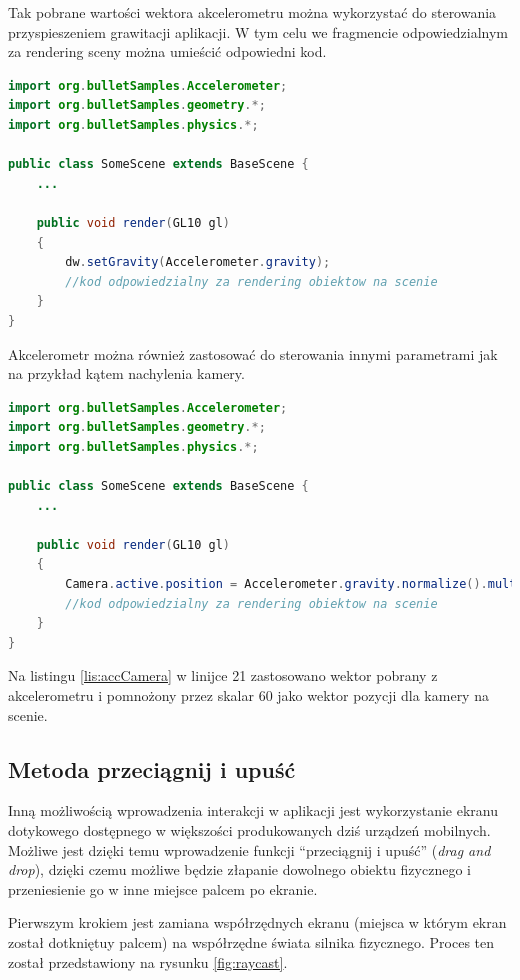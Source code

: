 Tak pobrane wartości wektora akcelerometru można wykorzystać do sterowania
przyspieszeniem grawitacji aplikacji. W tym celu we fragmencie odpowiedzialnym
za rendering sceny można umieścić odpowiedni kod.

\begin{lstlisting}[language=java, caption=Sterowanie wektorem przyspieszenia
ziemskiego przy pomocy akcelerometru]import org.bulletSamples.Accelerometer;
import org.bulletSamples.geometry.*;
import org.bulletSamples.physics.*;

public class SomeScene extends BaseScene {
	...
	
	public void render(GL10 gl)
	{
		dw.setGravity(Accelerometer.gravity);
		//kod odpowiedzialny za rendering obiektow na scenie
	}
}
\end{lstlisting}

Akcelerometr można również zastosować do sterowania innymi parametrami jak na
przykład kątem nachylenia kamery.

\newpage
\begin{lstlisting}[language=java, caption=Sterowanie kątem nachylenia kamery
przy pomocy akcelerometru, label=lis:accCamera]import org.bulletSamples.Accelerometer;
import org.bulletSamples.geometry.*;
import org.bulletSamples.physics.*;

public class SomeScene extends BaseScene {
	...
	
	public void render(GL10 gl)
	{
		Camera.active.position = Accelerometer.gravity.normalize().multiply(60);
		//kod odpowiedzialny za rendering obiektow na scenie
	}
}
\end{lstlisting}

Na listingu \ref{lis:accCamera} w linijce 21 zastosowano wektor pobrany z
akcelerometru i pomnożony przez skalar 60 jako wektor pozycji dla kamery na
scenie.

\subsection{Metoda przeciągnij i upuść}\label{sec:dragAndDrop}
Inną możliwością wprowadzenia interakcji w aplikacji jest wykorzystanie ekranu
dotykowego dostępnego w większości produkowanych dziś urządzeń mobilnych.
Możliwe jest dzięki temu wprowadzenie funkcji ``przeciągnij i upuść''
(\emph{drag and drop}), dzięki czemu możliwe będzie złapanie dowolnego obiektu
fizycznego i przeniesienie go w inne miejsce palcem po ekranie.

Pierwszym krokiem jest zamiana współrzędnych ekranu (miejsca w którym ekran
został dotkniętuy palcem) na współrzędne świata silnika fizycznego. Proces ten
został przedstawiony na rysunku \ref{fig:raycast}.

